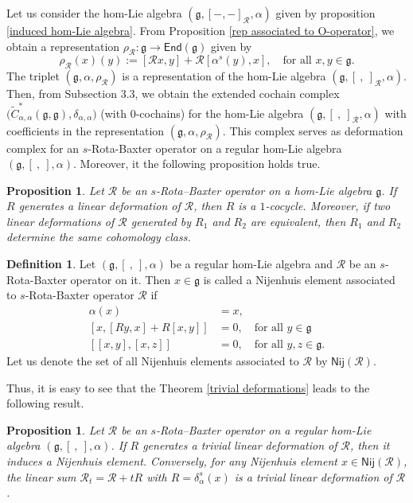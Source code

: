 \documentclass[a4paper,11pt]{amsart}
\theoremstyle{plain}
\newtheorem{proposition}[theorem]{Proposition}
\theoremstyle{definition}
\newtheorem{definition}[theorem]{Definition}
\theoremstyle{remark}
\numberwithin{equation}{section}
\begin{document}
Let us consider the hom-Lie algebra $(\mathfrak{g},[-,-]_\mathcal{R},\alpha)$ given by proposition \ref{induced hom-Lie algebra}. From Proposition \ref{rep associated to O-operator}, we obtain a representation $\rho_\mathcal{R}:\mathfrak{g} \rightarrow \mathsf{End}(\mathfrak{g})$ given by
$$\rho_\mathcal{R}(x)(y):=[\mathcal{R}x,y]+\mathcal{R}[\alpha^s(y),x],\quad \mbox{for all  }x,y \in\mathfrak{g}.$$
The triplet $(\mathfrak{g},\alpha,\rho_\mathcal{R})$ is a representation of the hom-Lie algebra $(\mathfrak{g},[~,~]_\mathcal{R},\alpha)$. Then, from Subsection $3.3$, we obtain the extended cochain complex $\big(\widetilde{C}^*_{\alpha,\alpha}(\mathfrak{g},\mathfrak{g}),\delta_{\alpha,\alpha}\big)$ (with $0$-cochains) for the hom-Lie algebra $(\mathfrak{g},[~,~]_\mathcal{R},\alpha)$ with coefficients in the representation $(\mathfrak{g},\alpha,\rho_\mathcal{R})$. This complex serves as deformation complex for an $s$-Rota-Baxter operator on a regular hom-Lie algebra $(\mathfrak{g},[~,~],\alpha)$. Moreover, it the following proposition holds true.


\begin{proposition} Let $\mathcal{R}$ be an $s$-Rota–Baxter operator on a hom-Lie algebra $\mathfrak{g}$. If
$R$ generates a linear deformation of $\mathcal{R}$, then $R$ is a $1$-cocycle. Moreover, if two linear
deformations of $\mathcal{R}$ generated by $R_1$ and $R_2$ are equivalent, then $R_1$ and $R_2$ determine the
same cohomology class.
\end{proposition}

\begin{definition}
Let $(\mathfrak{g},[~,~],\alpha)$ be a regular hom-Lie algebra and $\mathcal{R}$ be an $s$-Rota-Baxter operator on it. 
Then $x\in \mathfrak{g}$ is called a Nijenhuis
element associated to $s$-Rota-Baxter operator $\mathcal{R}$ if
\begin{align*}
\alpha(x)&=x,\\
[x, [Ry, x] + R[x, y]] &= 0, \quad\mbox{for all  } y \in \mathfrak{g} \\
[[x, y], [x, z]]& = 0,\quad\mbox{for all  }  y, z \in \mathfrak{g}.
\end{align*}
Let us denote the set of all Nijenhuis elements associated to $\mathcal{R}$ by $\mathsf{Nij}(\mathcal{R})$.
\end{definition}

Thus, it is easy to see that the Theorem \ref{trivial deformations} leads to the following result.
\begin{proposition}
 Let $\mathcal{R}$ be an $s$-Rota–Baxter operator on a regular hom-Lie algebra $(\mathfrak{g},[~,~],\alpha)$. If
$R$ generates a trivial linear deformation of $\mathcal{R}$, then it induces a Nijenhuis element. Conversely, for any Nijenhuis element $x\in \mathsf{Nij}(\mathcal{R})$, the linear sum $\mathcal{R}_t = \mathcal{R} + t R$ with $R= \delta_{\alpha}^s(x)$ is a
trivial linear deformation of $\mathcal{R}$. 
\end{proposition}
\end{document}
